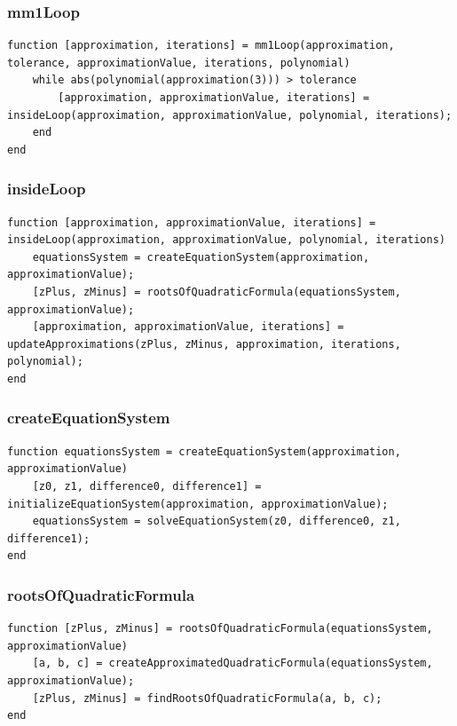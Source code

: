 \subsubsection{mm1Loop}
\begin{simplechar}
\begin{lstlisting}
function [approximation, iterations] = mm1Loop(approximation, tolerance, approximationValue, iterations, polynomial)
    while abs(polynomial(approximation(3))) > tolerance
        [approximation, approximationValue, iterations] = insideLoop(approximation, approximationValue, polynomial, iterations);
    end
end
\end{lstlisting}
\end{simplechar}

\subsubsection{insideLoop}
\begin{simplechar}
\begin{lstlisting}
function [approximation, approximationValue, iterations] = insideLoop(approximation, approximationValue, polynomial, iterations)
    equationsSystem = createEquationSystem(approximation, approximationValue);
    [zPlus, zMinus] = rootsOfQuadraticFormula(equationsSystem, approximationValue);
    [approximation, approximationValue, iterations] = updateApproximations(zPlus, zMinus, approximation, iterations, polynomial);
end
\end{lstlisting}
\end{simplechar}

\subsubsection{createEquationSystem}
\begin{simplechar}
\begin{lstlisting}
function equationsSystem = createEquationSystem(approximation, approximationValue)
    [z0, z1, difference0, difference1] = initializeEquationSystem(approximation, approximationValue);
    equationsSystem = solveEquationSystem(z0, difference0, z1, difference1);
end
\end{lstlisting}
\end{simplechar}

\subsubsection{rootsOfQuadraticFormula}
\begin{simplechar}
\begin{lstlisting}
function [zPlus, zMinus] = rootsOfQuadraticFormula(equationsSystem, approximationValue)
    [a, b, c] = createApproximatedQuadraticFormula(equationsSystem, approximationValue);
    [zPlus, zMinus] = findRootsOfQuadraticFormula(a, b, c);
end
\end{lstlisting}
\end{simplechar}

